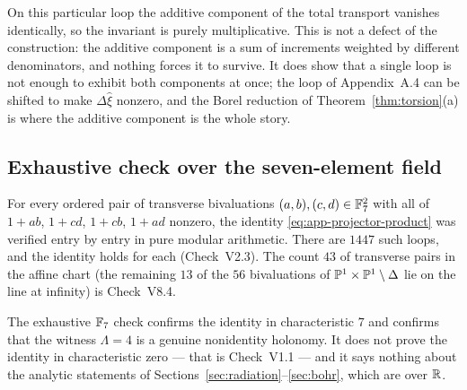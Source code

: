 \begin{remark}
\label{rem:additive-cancels}
On this particular loop the additive component of the total transport vanishes
identically, so the invariant is purely multiplicative.  This is not a defect of
the construction: the additive component is a sum of increments weighted by
different denominators, and nothing forces it to survive.  It does show that a
single loop is not enough to exhibit both components at once; the loop of
Appendix~A.4 can be shifted to make $\Delta\hat\xi$ nonzero, and the Borel
reduction of Theorem~\ref{thm:torsion}(a) is where the additive component is the
whole story.
\end{remark}

\subsection{Exhaustive check over the seven-element field}

For every ordered pair of transverse bivaluations
$(a,b),(c,d)\in\mathbb{F}_7^2$ with all of $1+ab$, $1+cd$, $1+cb$, $1+ad$ nonzero, the
identity \eqref{eq:app-projector-product} was verified entry by entry in pure
modular arithmetic.  There are $1447$ such loops, and the identity holds for
each (Check~V2.3).  The count $43$ of transverse pairs in the affine chart
(the remaining $13$ of the $56$ bivaluations of $\mathbb{P}^1\times\mathbb{P}^1\setminus\Delta$
lie on the line at infinity) is Check~V8.4.

\begin{warning}
The exhaustive $\mathbb{F}_7$ check confirms the identity in characteristic $7$ and
confirms that the witness $\Lambda=4$ is a genuine nonidentity holonomy.  It does
not prove the identity in characteristic zero --- that is Check~V1.1 --- and it
says nothing about the analytic statements of
Sections~\ref{sec:radiation}--\ref{sec:bohr}, which are over $\mathbb{R}$.
\end{warning}
